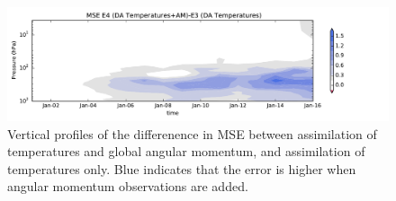  \begin{figure}
	 \includegraphics[width=\textwidth]{Paper_figures/ERPDA_paper_MSE_RST_vs_ERPRST.pdf}
	 \caption{Vertical profiles of the differenence in MSE between assimilation of temperatures and global angular momentum, and assimilation of temperatures only. Blue indicates that the error is higher when angular momentum observations are added.}
	 \label{fig:added_value_MSE}
\end{figure}
